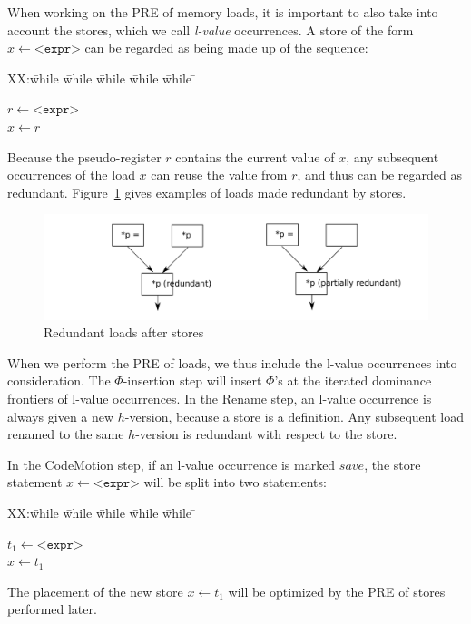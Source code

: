 When working on the PRE of memory loads, it is important to also take into
account the stores, which we call \emph{l-value} occurrences.  A store of the 
form $x \leftarrow \texttt{<expr>}$ can be regarded as being made up of the
sequence:
\begin{tabbing}
XX:\= while \= while \= while \= while \= while \= \kill

\> \> $r \leftarrow \texttt{<expr>}$ \\
\> \> $x \leftarrow r$ \\
\end{tabbing}
Because the pseudo-register $r$ contains the current value of $x$, any
subsequent occurrences of the load $x$ can reuse the value from $r$, and
thus can be regarded as redundant.   Figure~\ref{fig: lval-occur} gives examples
of loads made redundant by stores.

\begin{figure}
\centering
\includegraphics[scale=0.55]{fig-lval-occur}
\caption{Redundant loads after stores}
\label{fig: lval-occur}
\end{figure}

When we perform the PRE of loads, we thus include the l-value occurrences into
consideration.  The $\Phi$-insertion step will insert $\Phi$'s at the iterated
dominance frontiers of l-value occurrences.  In the Rename step, an l-value
occurrence is always given a new $h$-version, because a store is a definition.
Any subsequent load renamed to the same $h$-version is redundant with respect
to the store.

In the CodeMotion step, if an l-value occurrence is marked $save$, the
store statement $x \leftarrow \texttt{<expr>}$ will be split into two 
statements:
\begin{tabbing}
XX:\= while \= while \= while \= while \= while \= \kill

\> \> $t_1 \leftarrow \texttt{<expr>}$ \\
\> \> $x \leftarrow t_1$ \\
\end{tabbing}
The placement of the new store $x \leftarrow t_1$ will be optimized by the PRE
of stores performed later.

